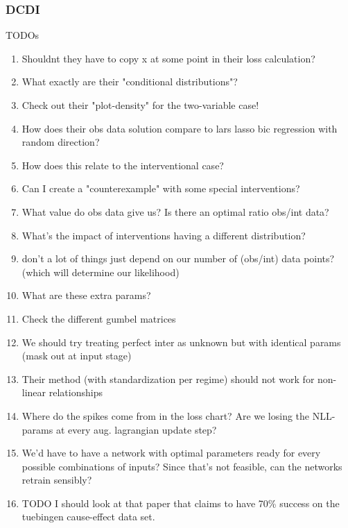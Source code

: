 \documentclass{article}
\begin{document}
\subsubsection{DCDI}
\noindent
TODOs
\begin{enumerate}
    \item Shouldnt they have to copy x at some point in their loss calculation?
    \item What exactly are their "conditional distributions"?
    \item Check out their "plot-density" for the two-variable case!
    \item How does their obs data solution compare to lars lasso bic regression with random direction? 
    \item How does this relate to the interventional case?
    \item Can I create a "counterexample" with some special interventions?
    \item What value do obs data give us? Is there an optimal ratio obs/int 
    data?
    \item What's the impact of interventions having a different distribution?
    \item don't a lot of things just depend on our number of (obs/int) data points? (which will determine our likelihood)
    \item What are these extra params?
    \item Check the different gumbel matrices
    \item We should try treating perfect inter as unknown but with identical params (mask out at input stage)
    \item Their method (with standardization per regime) should not work for non-linear relationships
    \item Where do the spikes come from in the loss chart? Are we losing the NLL-params at every aug. lagrangian update step?
    \item We'd have to have a network with optimal parameters ready for every possible combinations of inputs? Since that's not feasible, can the networks retrain sensibly?
    \item TODO I should look at that paper that claims to have 70\% success on the tuebingen cause-effect data set.
\end{enumerate}
\end{document}
